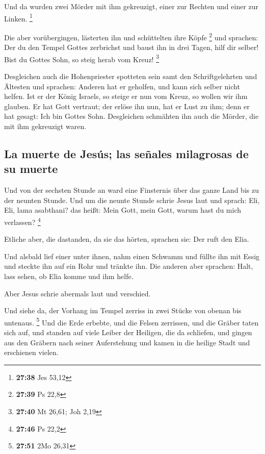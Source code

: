  Und da wurden zwei Mörder mit ihm gekreuzigt, einer zur
Rechten und einer zur Linken. \footnote{\textbf{27:38} Jes 53,12}

 Die aber vorübergingen, lästerten ihn und schüttelten
ihre Köpfe \footnote{\textbf{27:39} Ps 22,8}  und
sprachen: Der du den Tempel Gottes zerbrichst und baust ihn in drei
Tagen, hilf dir selber! Bist du Gottes Sohn, so steig herab vom Kreuz!
\footnote{\textbf{27:40} Mt 26,61; Joh 2,19}

 Desgleichen auch die Hohenpriester spotteten sein samt
den Schriftgelehrten und Ältesten und sprachen:  Anderen
hat er geholfen, und kann sich selber nicht helfen. Ist er der König
Israels, so steige er nun vom Kreuz, so wollen wir ihm glauben.
 Er hat Gott vertraut; der erlöse ihn nun, hat er Lust zu
ihm; denn er hat gesagt: Ich bin Gottes Sohn. 
Desgleichen schmähten ihn auch die Mörder, die mit ihm gekreuzigt waren.

\hypertarget{la-muerte-de-jesuxfas-las-seuxf1ales-milagrosas-de-su-muerte}{%
\subsection{La muerte de Jesús; las señales milagrosas de su
muerte}\label{la-muerte-de-jesuxfas-las-seuxf1ales-milagrosas-de-su-muerte}}

 Und von der sechsten Stunde an ward eine Finsternis über
das ganze Land bis zu der neunten Stunde.  Und um die
neunte Stunde schrie Jesus laut und sprach: Eli, Eli, lama asabthani?
das heißt: Mein Gott, mein Gott, warum hast du mich verlassen?
\footnote{\textbf{27:46} Ps 22,2}

 Etliche aber, die dastanden, da sie das hörten, sprachen
sie: Der ruft den Elia.

 Und alsbald lief einer unter ihnen, nahm einen Schwamm
und füllte ihn mit Essig und steckte ihn auf ein Rohr und tränkte ihn.
 Die anderen aber sprachen: Halt, lass sehen, ob Elia
komme und ihm helfe.

 Aber Jesus schrie abermals laut und verschied.

 Und siehe da, der Vorhang im Tempel zerriss in zwei
Stücke von obenan bis untenaus. \footnote{\textbf{27:51} 2Mo 26,31}
 Und die Erde erbebte, und die Felsen zerrissen, und die
Gräber taten sich auf, und standen auf viele Leiber der Heiligen, die da
schliefen,  und gingen aus den Gräbern nach seiner
Auferstehung und kamen in die heilige Stadt und erschienen vielen.

